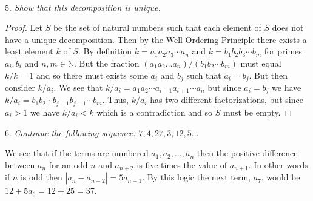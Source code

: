 ~\documentclass{article}
\begin{document}
\begin{flushleft}
5. \textsl{Show that this decomposition is unique.}
\begin{proof}
Let $S$ be the set of natural numbers such that each element of $S$ does not have a unique decomposition. Then by the Well Ordering Principle there exists a least element $k$ of $S$. By definition $k=a_1a_2a_3 \cdots a_n$ and $k=b_1b_2b_3 \cdots b_m$ for primes $a_i,b_i$ and $n,m \in \mathbb{N}$. But the fraction $(a_1a_2 \dots a_n) / (b_1b_2 \cdots b_m)$ must equal $k/k=1$ and so there must exists some $a_i$ and $b_j$ such that $a_i=b_j$. But then consider $k/a_i$. We see that $k/a_i=a_1a_2 \cdots a_{i-1}a_{i+1} \cdots a_n$ but since $a_i = b_j$ we have $k/a_i = b_1b_2 \cdots b_{j-1}b_{j+1} \cdots b_m$. Thus, $k/a_i$ has two different factorizations, but since $a_i > 1$ we have $k/a_i < k$ which is a contradiction and so $S$ must be empty.
\end{proof}

6. \textsl{Continue the following sequence: $7,4,27,3,12,5...$}\newline

We see that if the terms are numbered $a_1,a_2,\dots ,a_n$ then the positive difference between $a_n$ for an odd $n$ and $a_{n+2}$ is five times the value of $a_{n+1}$. In other words if $n$ is odd then $| a_n - a_{n+2} | = 5 a_{n+1}$. By this logic the next term, $a_7$, would be $12 + 5a_6 = 12 + 25 = 37$.





\end{flushleft}
\end{document}
